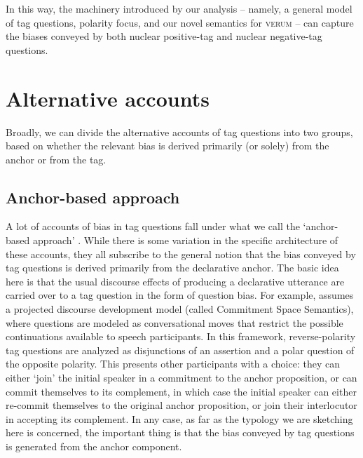 \documentclass[output=paper,colorlinks,citecolor=brown]{langscibook}
\begin{document}
In this way, the machinery introduced by our analysis -- namely, a general model of tag questions, polarity focus, and our novel semantics for \textsc{verum} -- can capture the biases conveyed by both nuclear positive-tag and nuclear negative-tag questions.

\section{Alternative accounts}\label{Sect5}
Broadly, we can divide the alternative accounts of tag questions into two groups, based on whether the relevant bias is derived primarily (or solely) from the anchor or from the tag.   

\subsection{Anchor-based approach}
A lot of accounts of bias in tag questions fall under what we call the `anchor-based approach' \citep{Reese2007, Reese2009, krifka2015, Malamud2015, jamieson2018, Woods2021}. While there is some variation in the specific architecture of these accounts, they all subscribe to the general notion that the bias conveyed by tag questions is derived primarily from the declarative anchor. The basic idea here is that the usual discourse effects of producing a declarative utterance are carried over to a tag question in the form of question bias. For example, \citet{krifka2015} assumes a projected discourse development model (called Commitment Space Semantics), where questions are modeled as conversational moves that restrict the possible continuations available to speech participants. In this framework, reverse-polarity tag questions are analyzed as disjunctions of an assertion and a polar question of the opposite polarity. This presents other participants with a choice: they can either `join' the initial speaker in a commitment to the anchor proposition, or can commit themselves to its complement, in which case the initial speaker can either re-commit themselves to the original anchor proposition, or join their interlocutor in accepting its complement. In any case, as far as the typology we are sketching here is concerned, the important thing is that the bias conveyed by tag questions is generated from the anchor component. 
\end{document}
